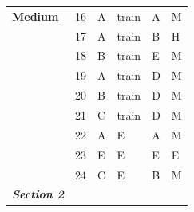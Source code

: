 \documentclass[pageno]{final_paper}
\newcommand{\textbi}[1]{\textbf{\textit{#1}}}
\begin{document}
\begin{table}[]
\begin{tabular}{@{}llllll@{}}
\textbf{Medium}         & 16                                  & A                                          & train                                       & A                                           & M                                       \\
\textbf{}               & 17                                  & A                                          & train                                       & B                                           & H                                       \\
\textbf{}               & 18                                  & B                                          & train                                       & E                                           & M                                       \\
\textbf{}               & 19                                  & A                                          & train                                       & D                                           & M                                       \\
\textbf{}               & 20                                  & B                                          & train                                       & D                                           & M                                       \\
\textbf{}               & 21                                  & C                                          & train                                       & D                                           & M                                       \\
\textbf{}               & 22                                  & A                                          & E                                           & A                                           & M                                       \\
\textbf{}               & 23                                  & E                                          & E                                           & E                                           & E                                       \\
\textbf{}               & 24                                  & C                                          & E                                           & B                                           & M                                       \\ \midrule
\textbi{Section 2}      &                                     &                                            &                                             &                                             &                                         \\ \midrule

\end{tabular}
\end{table}
\end{document}
